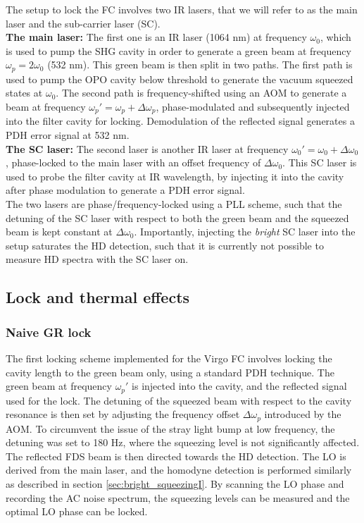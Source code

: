 The setup to lock the FC involves two IR lasers, that we will refer to as the main laser and the sub-carrier laser (SC). \\


\noindent \textbf{The main laser:} The first one is an IR laser (1064 nm) at frequency $\omega_0$, which is used to pump the SHG cavity in order to generate a green beam at frequency $\omega_p = 2\omega_0$ (532 nm). This green beam is then split in two paths. The first path is used to pump the OPO cavity below threshold to generate the vacuum squeezed states at $\omega_0$. The second path is frequency-shifted using an AOM to generate a beam at frequency $\omega_p'=\omega_p + \Delta \omega_p$, phase-modulated and subsequently injected into the filter cavity for locking. Demodulation of the reflected signal generates a PDH error signal at 532 nm.  \\  

\noindent \textbf{The SC laser:} The second laser is another IR laser at frequency $\omega_0' = \omega_0 + \Delta \omega_0$, phase-locked to the main laser with an offset frequency of $\Delta \omega_0$. This SC laser is used to probe the filter cavity at IR wavelength, by injecting it into the cavity after phase modulation to generate a PDH error signal. \\ 

The two lasers are phase/frequency-locked using a PLL scheme, such that the detuning of the SC laser with respect to both the green beam and the squeezed beam is kept constant at $\Delta \omega_0$. Importantly, injecting the \textit{bright} SC laser into the setup saturates the HD detection, such that it is currently not possible to measure HD spectra with the SC laser on. 

\subsection{Lock and thermal effects}
\subsubsection{Naive GR lock}

The first locking scheme implemented for the Virgo FC involves locking the cavity length to the green beam only, using a standard PDH technique. The green beam at frequency $\omega_p'$ is injected into the cavity, and the reflected signal used for the lock. The detuning of the squeezed beam with respect to the cavity resonance is then set by adjusting the frequency offset $\Delta \omega_p$ introduced by the AOM. To circumvent the issue of the stray light bump at low frequency, the detuning was set to 180 Hz, where the squeezing level is not significantly affected. The reflected FDS beam is then directed towards the HD detection. The LO is derived from the main laser, and the homodyne detection is performed similarly as described in section \ref{sec:bright_squeezingI}. By scanning the LO phase and recording the AC noise spectrum, the squeezing levels can be measured and the optimal LO phase can be locked. \\

